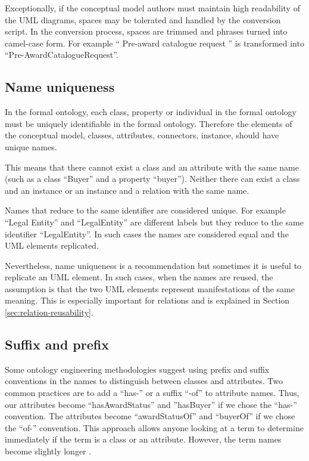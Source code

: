 	Exceptionally, if the conceptual model authors must maintain high readability of the UML diagrams, spaces may be tolerated and handled by the conversion script. In the conversion process, spaces are trimmed and phrases turned into camel-case form. For example `` Pre-award   catalogue request  '' is transformed into ``Pre-AwardCatalogueRequest''. 
	
	\subsection{Name uniqueness}
	\label{sec:uniqueness}
	
	In the formal ontology, each class, property or individual in the formal ontology must be uniquely identifiable in the formal ontology. Therefore the elements of the conceptual model, classes, attributes, connectors, instance, should have unique names. 
	
	This means that there cannot exist a class and an attribute with the same name (such as a class ``Buyer'' and a property ``buyer''). Neither there can exist a class and an instance or an instance and a relation with the same name. 

	Names that reduce to the same identifier are considered unique. For example ``Legal Entity'' and ``LegalEntity'' are different labels but they reduce to the same identifier ``LegalEntity''. In such cases the names are considered equal and the UML elements replicated.
	
	Nevertheless, name uniqueness is a recommendation but sometimes it is useful to replicate an UML element. In such cases, when the names are reused, the assumption is that the two UML elements represent manifestations of the same meaning. This is especially important for relations and is explained in Section \ref{sec:relation-reusability}.	
	
	\subsection{Suffix and prefix}
	\label{sec:suffix-prefix}
	
	Some ontology engineering methodologies suggest using prefix and suffix conventions in the names to distinguish between classes and attributes. Two common practices are to add a ``has-'' or a suffix ``-of'' to attribute names. Thus, our attributes become ``hasAwardStatus'' and ''hasBuyer'' if we chose the ``has-'' convention. The attributes become ``awardStatusOf'' and ``buyerOf'' if we chose the ``of-'' convention. This approach allows anyone looking at a term to determine immediately if the term is a class or an attribute. However, the term names become slightly longer \cite{noy2001}.
	
